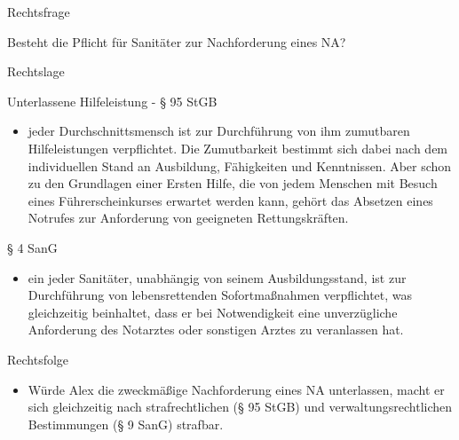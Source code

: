 \documentclass{article}
\begin{document}
Rechtsfrage

Besteht die Pflicht f\"ur Sanit\"ater zur Nachforderung eines NA?

Rechtslage

Unterlassene Hilfeleistung - {\S} 95 StGB

\begin{itemize}
\item jeder Durchschnittsmensch ist zur Durchf\"uhrung von ihm
zumutbaren Hilfeleistungen verpflichtet. Die Zumutbarkeit bestimmt sich
dabei nach dem individuellen Stand an Ausbildung, F\"ahigkeiten und
Kenntnissen. Aber schon zu den Grundlagen einer Ersten Hilfe, die von
jedem Menschen mit Besuch eines F\"uhrerscheinkurses erwartet werden
kann, geh\"ort das Absetzen eines Notrufes zur  Anforderung von
geeigneten Rettungskr\"aften.

\end{itemize}
{\S} 4 SanG

\begin{itemize}
\item ein jeder Sanit\"ater, unabh\"angig von seinem Ausbildungsstand,
ist zur Durchf\"uhrung von lebensrettenden Sofortma{\ss}nahmen
verpflichtet, was gleichzeitig beinhaltet, dass er bei Notwendigkeit
eine unverz\"ugliche Anforderung des Notarztes oder sonstigen Arztes zu
veranlassen hat.

\end{itemize}
Rechtsfolge

\begin{itemize}
\item W\"urde Alex die zweckm\"a{\ss}ige Nachforderung eines NA
unterlassen, macht er sich gleichzeitig nach strafrechtlichen ({\S} 95
StGB) und verwaltungsrechtlichen Bestimmungen ({\S} 9 SanG) strafbar.

\end{itemize}
\end{document}
